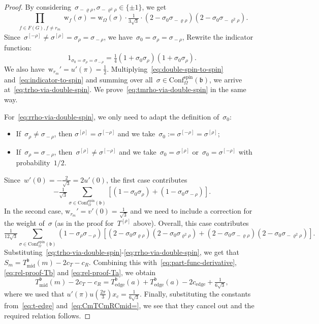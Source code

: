 \documentclass[reqno,11pt,a4paper]{amsart}
\theoremstyle{remark}
\newcommand{\Te}{T_{\mathrm{edge}}}       \newcommand{\Ce}{c_{\mathrm{edge}}}
\newcommand{\Tm}{T_{\mathrm{mid}}}        \newcommand{\Cm}{c_{\mathrm{mid}}}
\newcommand{\CmT}{c_T}
\newcommand{\CmR}{c_R}
\newcommand{\Trho}{T^{[\rho]}}
\renewcommand{\b}{\mathfrak{b}}
\newcommand{\seOne}{\sigma_{\rho}}
\newcommand{\seTwo}{\sigma_{\varrho\rho}}
\newcommand{\seThree}{\sigma_{\varrho^2\rho}}
\newcommand{\seFour}{\sigma_{\!-\rho}}
\newcommand{\seFive}{\sigma_{\!-\varrho\rho}}
\newcommand{\seSix}{\sigma_{\!-\varrho^2\rho}}
\newcommand{\weight}{\mathrm{w}}
\newcommand{\conf}{\mathrm{Conf}}
\newcommand\ConfOs[1]{\conf^{\mathrm{spin}}_\Omega(#1)}
\begin{document}
\begin{proof}
	By considering~$\seFive,\seSix\in \{\pm1\}$, we get
	\begin{equation}\label{eq:double-spin-to-spin}
		\prod_{\substack{f\in F(G), f\neq r_{m}}} \weight_{f}(\sigma) = \weight_\Omega(\sigma) \cdot \tfrac{1}{3\sqrt{3}} \cdot (2-\sigma_0\seFive)(2-\sigma_0\seSix).
	\end{equation}
	Since~$\sigma^{[-\rho]} \neq \sigma^{[\rho]} = \seOne = \seFour$, we have~$\sigma_0 = \seOne = \seFour$,
	Rewrite the indicator function:
	\begin{equation}\label{eq:indicator-to-spin}
		1_{\sigma_0 = \seOne = \seFour} = \tfrac14(1+\sigma_0\seOne)(1+\sigma_0\seOne).
	\end{equation}
	We also have~$\weight_{r_m}' = u'(\pi) = \frac12$.
	Multiplying~\eqref{eq:double-spin-to-spin} and~\eqref{eq:indicator-to-spin} and summing over all~$\sigma\in \ConfOs{\b}$, we arrive at~\eqref{eq:trho-via-double-spin}. We prove~\eqref{eq:tmrho-via-double-spin} in the same way. 

	For~\eqref{eq:rrho-via-double-spin}, we only need to adapt the definition of~$\sigma_0$:
	\begin{itemize}
		\item If~$\seOne \neq \seFour$, then $\sigma^{[\rho]} = \sigma^{[-\rho]}$ and we take~$\sigma_0 := \sigma^{[-\rho]} = \sigma^{[\rho]}$;
		\item If~$\seOne = \seFour$, then~$\sigma^{[\rho]} \neq \sigma^{[-\rho]}$ and we take~$\sigma_0 =\sigma^{[\rho]}$ or~$\sigma_0 =\sigma^{[-\rho]}$ with probability~$1/2$.
	\end{itemize}
	Since~$w'(0) = -\frac{2}{\sqrt{3}} = 2u'(0)$, the first case contributes
	\[
		-\tfrac1{\sqrt{3}} \sum_{\sigma\in\ConfOs{\b}} [(1-\sigma_0\seOne) + (1-\sigma_0\seFour)].
	\]
	In the second case, $\weight_{r_m}' = v'(0) = \frac1{\sqrt{3}}$ and we need to include a correction for the weight of~$\sigma$ (as in the proof for~$\Trho$ above). Overall, this case contributes
	\[
		\tfrac1{12\sqrt{3}}\sum_{\sigma\in\ConfOs{\b}} (1-\seOne\seFour)\left[(2-\sigma_0\seTwo)(2-\sigma_0\seThree) + (2-\sigma_0\seFive)(2-\sigma_0\seSix) \right].
	\]	
	Substituting~\eqref{eq:trho-via-double-spin}-\eqref{eq:rrho-via-double-spin}, we get that~$S_{m} = \Tm^{\b}(m) - 2\CmT - \CmR$.
	Combining this with~\eqref{eq:part-func-derivative}, \eqref{eq:rel-proof-Tb} and \eqref{eq:rel-proof-Ta}, we obtain
	\[
		\Tm^{\b}(m) - 2\CmT - \CmR = \Te^{\b}(a) +  \Te^{\b}(a) - 2\Ce + \tfrac{1}{6\sqrt{3}},
	\]
	where we used that $u'(\pi)u(\tfrac{2\pi}{3})x_{c} = \tfrac{1}{6\sqrt{3}}$. Finally, substituting the constants from~\eqref{eq:t-edge} and~\eqref{eq:CmTCmRCmid=}, we see that they cancel out and the required relation follows.
\end{proof}
\end{document}
